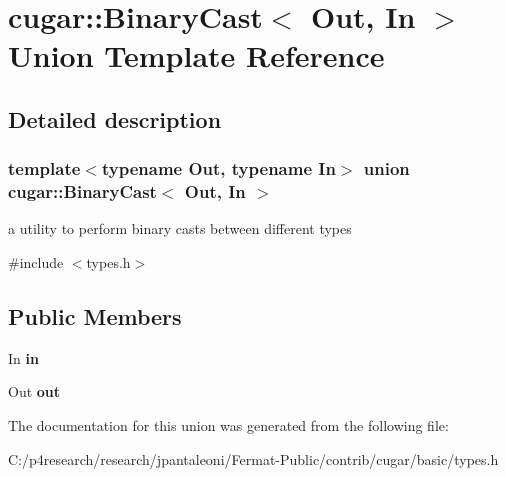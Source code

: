 \hypertarget{unioncugar_1_1_binary_cast}{}\section{cugar\+:\+:Binary\+Cast$<$ Out, In $>$ Union Template Reference}
\label{unioncugar_1_1_binary_cast}


\subsection{Detailed description}
\subsubsection*{template$<$typename Out, typename In$>$\newline
union cugar\+::\+Binary\+Cast$<$ Out, In $>$}

a utility to perform binary casts between different types 

{\ttfamily \#include $<$types.\+h$>$}

\subsection*{Public Members}
\begin{DoxyCompactItemize}
\item 
\mbox{\label{unioncugar_1_1_binary_cast_a0f2f7411e4d5666f6c6d8814d8a8e42f}} 
In {\bfseries in}
\item 
\mbox{\label{unioncugar_1_1_binary_cast_a8c3f6269d984b65fff38535fc8e020cc}} 
Out {\bfseries out}
\end{DoxyCompactItemize}


The documentation for this union was generated from the following file\+:\begin{DoxyCompactItemize}
\item 
C\+:/p4research/research/jpantaleoni/\+Fermat-\/\+Public/contrib/cugar/basic/types.\+h\end{DoxyCompactItemize}
